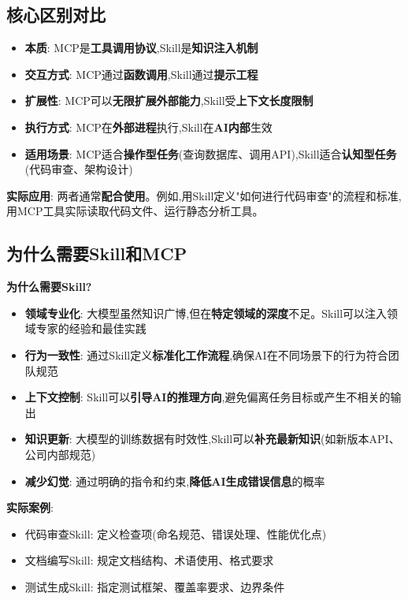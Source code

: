 \documentclass[UTF8]{ctexart}
\begin{document}
\subsection{核心区别对比}
\begin{itemize}
    \item \textbf{本质}: MCP是\textbf{工具调用协议},Skill是\textbf{知识注入机制}
    \item \textbf{交互方式}: MCP通过\textbf{函数调用},Skill通过\textbf{提示工程}
    \item \textbf{扩展性}: MCP可以\textbf{无限扩展外部能力},Skill受\textbf{上下文长度限制}
    \item \textbf{执行方式}: MCP在\textbf{外部进程}执行,Skill在\textbf{AI内部}生效
    \item \textbf{适用场景}: MCP适合\textbf{操作型任务}(查询数据库、调用API),Skill适合\textbf{认知型任务}(代码审查、架构设计)
\end{itemize}

\textbf{实际应用}: 两者通常\textbf{配合使用}。例如,用Skill定义"如何进行代码审查"的流程和标准,用MCP工具实际读取代码文件、运行静态分析工具。

\subsection{为什么需要Skill和MCP}

\textbf{为什么需要Skill?}

\begin{itemize}
    \item \textbf{领域专业化}: 大模型虽然知识广博,但在\textbf{特定领域的深度}不足。Skill可以注入领域专家的经验和最佳实践
    \item \textbf{行为一致性}: 通过Skill定义\textbf{标准化工作流程},确保AI在不同场景下的行为符合团队规范
    \item \textbf{上下文控制}: Skill可以\textbf{引导AI的推理方向},避免偏离任务目标或产生不相关的输出
    \item \textbf{知识更新}: 大模型的训练数据有时效性,Skill可以\textbf{补充最新知识}(如新版本API、公司内部规范)
    \item \textbf{减少幻觉}: 通过明确的指令和约束,\textbf{降低AI生成错误信息}的概率
\end{itemize}

\textbf{实际案例}:
\begin{itemize}
    \item 代码审查Skill: 定义检查项(命名规范、错误处理、性能优化点)
    \item 文档编写Skill: 规定文档结构、术语使用、格式要求
    \item 测试生成Skill: 指定测试框架、覆盖率要求、边界条件
\end{itemize}
\end{document}
